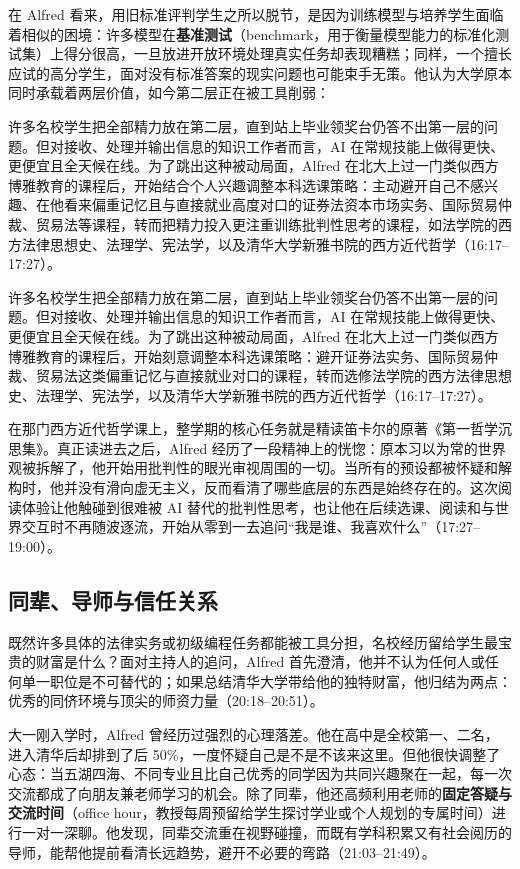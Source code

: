 \documentclass[UTF8,a4paper,11pt,fontset=fandol]{ctexart}
\begin{document}
在 Alfred 看来，用旧标准评判学生之所以脱节，是因为训练模型与培养学生面临着相似的困境：许多模型在\textbf{基准测试}（benchmark，用于衡量模型能力的标准化测试集）上得分很高，一旦放进开放环境处理真实任务却表现糟糕；同样，一个擅长应试的高分学生，面对没有标准答案的现实问题也可能束手无策。他认为大学原本同时承载着两层价值，如今第二层正在被工具削弱：

许多名校学生把全部精力放在第二层，直到站上毕业领奖台仍答不出第一层的问题。但对接收、处理并输出信息的知识工作者而言，AI 在常规技能上做得更快、更便宜且全天候在线。为了跳出这种被动局面，Alfred 在北大上过一门类似西方博雅教育的课程后，开始结合个人兴趣调整本科选课策略：主动避开自己不感兴趣、在他看来偏重记忆且与直接就业高度对口的证券法资本市场实务、国际贸易仲裁、贸易法等课程，转而把精力投入更注重训练批判性思考的课程，如法学院的西方法律思想史、法理学、宪法学，以及清华大学新雅书院的西方近代哲学（16:17–17:27）。

许多名校学生把全部精力放在第二层，直到站上毕业领奖台仍答不出第一层的问题。但对接收、处理并输出信息的知识工作者而言，AI 在常规技能上做得更快、更便宜且全天候在线。为了跳出这种被动局面，Alfred 在北大上过一门类似西方博雅教育的课程后，开始刻意调整本科选课策略：避开证券法实务、国际贸易仲裁、贸易法这类偏重记忆与直接就业对口的课程，转而选修法学院的西方法律思想史、法理学、宪法学，以及清华大学新雅书院的西方近代哲学（16:17–17:27）。

在那门西方近代哲学课上，整学期的核心任务就是精读笛卡尔的原著《第一哲学沉思集》。真正读进去之后，Alfred 经历了一段精神上的恍惚：原本习以为常的世界观被拆解了，他开始用批判性的眼光审视周围的一切。当所有的预设都被怀疑和解构时，他并没有滑向虚无主义，反而看清了哪些底层的东西是始终存在的。这次阅读体验让他触碰到很难被 AI 替代的批判性思考，也让他在后续选课、阅读和与世界交互时不再随波逐流，开始从零到一去追问“我是谁、我喜欢什么”（17:27–19:00）。

\subsection{同辈、导师与信任关系}
既然许多具体的法律实务或初级编程任务都能被工具分担，名校经历留给学生最宝贵的财富是什么？面对主持人的追问，Alfred 首先澄清，他并不认为任何人或任何单一职位是不可替代的；如果总结清华大学带给他的独特财富，他归结为两点：优秀的同侪环境与顶尖的师资力量（20:18–20:51）。

大一刚入学时，Alfred 曾经历过强烈的心理落差。他在高中是全校第一、二名，进入清华后却排到了后 50\%，一度怀疑自己是不是不该来这里。但他很快调整了心态：当五湖四海、不同专业且比自己优秀的同学因为共同兴趣聚在一起，每一次交流都成了向朋友兼老师学习的机会。除了同辈，他还高频利用老师的\textbf{固定答疑与交流时间}（office hour，教授每周预留给学生探讨学业或个人规划的专属时间）进行一对一深聊。他发现，同辈交流重在视野碰撞，而既有学科积累又有社会阅历的导师，能帮他提前看清长远趋势，避开不必要的弯路（21:03–21:49）。
\end{document}
